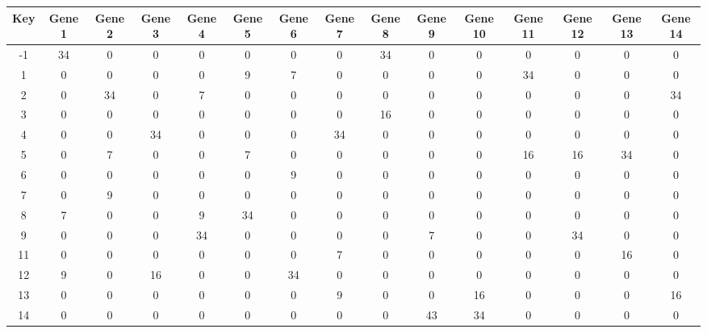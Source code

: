 \begin{tabular}{|c|c|c|c|c|c|c|c|c|c|c|c|c|c|c|}
\hline
Key & Gene 1 & Gene 2 & Gene 3 & Gene 4 & Gene 5 & Gene 6 & Gene 7 & Gene 8 & Gene 9 & Gene 10 & Gene 11 & Gene 12 & Gene 13 & Gene 14 \\
\hline
-1 & 34 & 0 & 0 & 0 & 0 & 0 & 0 & 34 & 0 & 0 & 0 & 0 & 0 & 0 \\
1 & 0 & 0 & 0 & 0 & 9 & 7 & 0 & 0 & 0 & 0 & 34 & 0 & 0 & 0 \\
2 & 0 & 34 & 0 & 7 & 0 & 0 & 0 & 0 & 0 & 0 & 0 & 0 & 0 & 34 \\
3 & 0 & 0 & 0 & 0 & 0 & 0 & 0 & 16 & 0 & 0 & 0 & 0 & 0 & 0 \\
4 & 0 & 0 & 34 & 0 & 0 & 0 & 34 & 0 & 0 & 0 & 0 & 0 & 0 & 0 \\
5 & 0 & 7 & 0 & 0 & 7 & 0 & 0 & 0 & 0 & 0 & 16 & 16 & 34 & 0 \\
6 & 0 & 0 & 0 & 0 & 0 & 9 & 0 & 0 & 0 & 0 & 0 & 0 & 0 & 0 \\
7 & 0 & 9 & 0 & 0 & 0 & 0 & 0 & 0 & 0 & 0 & 0 & 0 & 0 & 0 \\
8 & 7 & 0 & 0 & 9 & 34 & 0 & 0 & 0 & 0 & 0 & 0 & 0 & 0 & 0 \\
9 & 0 & 0 & 0 & 34 & 0 & 0 & 0 & 0 & 7 & 0 & 0 & 34 & 0 & 0 \\
11 & 0 & 0 & 0 & 0 & 0 & 0 & 7 & 0 & 0 & 0 & 0 & 0 & 16 & 0 \\
12 & 9 & 0 & 16 & 0 & 0 & 34 & 0 & 0 & 0 & 0 & 0 & 0 & 0 & 0 \\
13 & 0 & 0 & 0 & 0 & 0 & 0 & 9 & 0 & 0 & 16 & 0 & 0 & 0 & 16 \\
14 & 0 & 0 & 0 & 0 & 0 & 0 & 0 & 0 & 43 & 34 & 0 & 0 & 0 & 0 \\
\hline
\end{tabular}